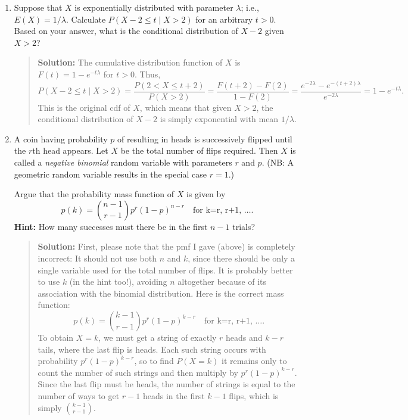\documentclass{article}
\begin{document}
\begin{enumerate}
\begin{enumerate}
  \end{enumerate}

  \item Suppose that $X$ is exponentially distributed with parameter $\lambda$;
  i.e., $E(X)=1/\lambda$. Calculate $P(X-2 \le t\mid X>2)$ for an arbitrary
  $t>0$. Based on your answer, what is the conditional distribution of $X-2$
  given $X>2$?
    \begin{quotation} {\bf Solution:}
    The cumulative distribution function of $X$ is $F(t) = 1-e^{-t\lambda}$ for $t>0$.  Thus,
    \[
    P(X-2 \le t\mid X>2) = \frac{P(2<X\le t+2)}{P(X>2)} = \frac{F(t+2)-F(2)}{1-F(2)} = 
    \frac{e^{-2\lambda} - e^{-(t+2)\lambda}}{e^{-2\lambda}} = 1-e^{-t\lambda}.
    \]
    This is the original cdf of $X$, which means that given $X>2$, the conditional
    distribution of $X-2$ is simply exponential with mean $1/\lambda$.
    \end{quotation}

  \item A coin having probability $p$ of resulting in heads is successively
  flipped until the $r$th head appears. Let $X$ be the total number of flips
  required. Then $X$ is called a {\em negative binomial} random variable with
  parameters $r$ and $p$. (NB: A geometric random variable results in the
  special case $r=1$.)

  Argue that the probability mass function of $X$ is given by
  \[
  p(k) = {{n-1}\choose{r-1}} p^r(1-p)^{n-r} \quad\mbox{for k=r, r+1, \ldots}.
  \]
  {\bf Hint:}  How many successes must there be in the first $n-1$ trials?
    \begin{quotation} {\bf Solution:}
    First, please note that the pmf I gave (above) is completely incorrect: It should not use both
    $n$ and $k$, since there should be only a single variable used for the total number of flips.
    It is probably better to use $k$ (in the hint too!), avoiding $n$ altogether because of its 
    association with the binomial distribution.  Here is the correct mass function:
    \[
    p(k) = {{k-1}\choose{r-1}} p^r(1-p)^{k-r} \quad\mbox{for k=r, r+1, \ldots}.
    \]
    To obtain $X=k$, we must get a string of exactly $r$ heads and $k-r$ tails,
    where the last flip is heads.
    Each such string occurs with probability $p^r(1-p)^{k-r}$, so to find $P(X=k)$
    it remains only to count the number of such strings and then multiply by
    $p^r(1-p)^{k-r}$.  Since the last flip must be heads, the number of strings is equal
    to the number of ways to get $r-1$ heads in the first $k-1$ flips, which is simply
    ${{k-1}\choose{r-1}}$.
    \end{quotation}


\end{enumerate}
\end{document}
